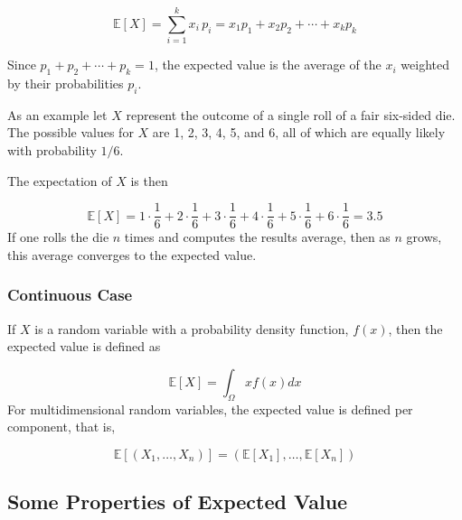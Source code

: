 \begin{equation}
	\mathbb{E}[X]=\sum _{i=1}^{k}x_{i}\,p_{i}=x_{1}p_{1}+x_{2}p_{2}+\cdots +x_{k}p_{k}
\end{equation}

Since $p_{1}+p_{2}+\cdots +p_{k}=1$, the expected value is the average of the $x_{i}$ weighted by their probabilities $p_{i}$.


As an example let $X$ represent the outcome of a single roll of a fair six-sided die. The possible values for $X$ are 1, 2, 3, 4, 5, and 6, all of which are equally likely with probability $1/6$.

The expectation of $X$ is then

\begin{equation*}
	\mathbb{E}[X]=1\cdot {\frac {1}{6}}+2\cdot {\frac {1}{6}}+3\cdot {\frac {1}{6}}+4\cdot {\frac {1}{6}}+5\cdot {\frac {1}{6}}+6\cdot {\frac {1}{6}}=3.5
\end{equation*}
If one rolls the die $n$ times and computes the results average, then as $n$ grows, this average converges to the expected value.

\subsubsection{Continuous Case}
If $X$ is a random variable with a probability density function, $f(x)$, then the expected value is defined as

\begin{equation}
\mathbb{E}[X]=\int_{\Omega}xf(x)dx
\end{equation}
For multidimensional random variables, the expected value is defined per component, that is,

\begin{equation}
\mathbb{E}[(X_{1},\ldots ,X_{n})]=(\mathbb{E} [X_{1}],\ldots ,\mathbb{E}[X_{n}])
\end{equation}

\subsection{Some Properties of Expected Value}
\label{some-properties}

